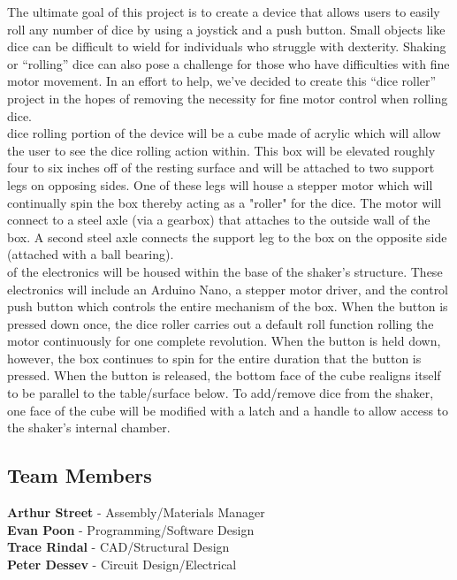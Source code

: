 \documentclass[12pt]{article}
\begin{document}
The ultimate goal of this project is to create a device that allows users to easily roll any number of dice by using a joystick and a push button. Small objects like dice can be difficult to wield for individuals who struggle with dexterity. Shaking or “rolling” dice can also pose a challenge for those who have difficulties with fine motor movement. In an effort to help, we've decided to create this “dice roller” project in the hopes of removing the necessity for fine motor control when rolling dice. \\
 dice rolling portion of the device will be a cube made of acrylic which will allow the user to see the dice rolling action within. This box will be elevated roughly four to six inches off of the resting surface and will be attached to two support legs on opposing sides. One of these legs will house a stepper motor which will continually spin the box thereby acting as a "roller" for the dice. The motor will connect to a steel axle (via a gearbox) that attaches to the outside wall of the box. A second steel axle connects the support leg to the box on the opposite side (attached with a ball bearing). \\
 of the electronics will be housed within the base of the shaker’s structure. These electronics will include an Arduino Nano, a stepper motor driver, and the control push button which controls the entire mechanism of the box. 
When the button is  pressed down once, the dice roller carries out a default roll function rolling the motor continuously for one complete revolution. When the button is held down, however, the box continues to spin for the entire duration that the button is pressed. When the button is released, the bottom face of the cube realigns itself to be parallel to the table/surface below. To add/remove dice from the shaker, one face of the cube will be modified with a latch and a handle to allow access to the shaker’s internal chamber.  


\subsection{Team Members}
\textbf{Arthur Street} - Assembly/Materials Manager\\
\textbf{Evan Poon} - Programming/Software Design\\
\textbf{Trace Rindal} - CAD/Structural Design\\
\textbf{Peter Dessev} - Circuit Design/Electrical\\
\end{document}
